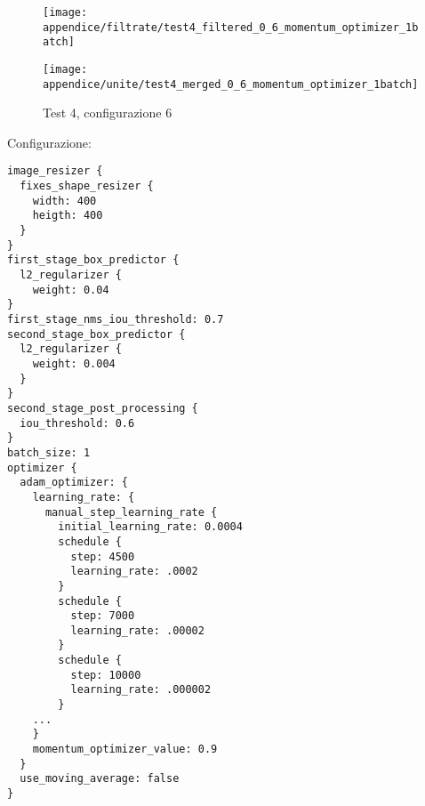 \newpage
\begin{figure}[H]  
    \begin{minipage}{.5\columnwidth}  
        \centering  
        \texttt{[image: appendice/filtrate/test4\_filtered\_0\_6\_momentum\_optimizer\_1batch]}  
    \end{minipage}%
    \begin{minipage}{0.5\columnwidth}  
        \centering  
        \texttt{[image: appendice/unite/test4\_merged\_0\_6\_momentum\_optimizer\_1batch]}  
    \end{minipage}  
    \caption{Test 4, configurazione 6}
\end{figure}%
Configurazione:
\begin{multicols}{2}
    \begin{lstlisting}
image_resizer {
  fixes_shape_resizer {
    width: 400
    heigth: 400
  }
}
first_stage_box_predictor {
  l2_regularizer {
    weight: 0.04
}
first_stage_nms_iou_threshold: 0.7
second_stage_box_predictor {
  l2_regularizer {
    weight: 0.004
  }
}
second_stage_post_processing {
  iou_threshold: 0.6
}
batch_size: 1
optimizer {
  adam_optimizer: {
    learning_rate: {
      manual_step_learning_rate {
        initial_learning_rate: 0.0004
        schedule {
          step: 4500
          learning_rate: .0002
        }
        schedule {
          step: 7000
          learning_rate: .00002
        }
        schedule {
          step: 10000
          learning_rate: .000002
        }
    ...
    }
    momentum_optimizer_value: 0.9
  }
  use_moving_average: false
}
    \end{lstlisting}
\end{multicols}
